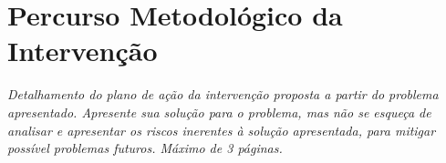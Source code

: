 \section{Percurso Metodológico da Intervenção}

\textit{Detalhamento do plano de ação da intervenção proposta a partir do problema apresentado. Apresente sua solução para o problema, mas não se esqueça de analisar e apresentar os riscos inerentes à solução apresentada, para mitigar possível problemas futuros. Máximo de 3 páginas.}
